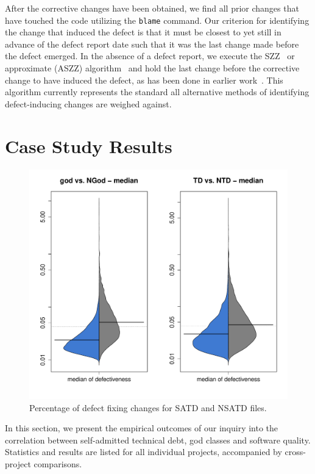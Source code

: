 After the corrective changes have been obtained, we find all prior changes that have touched the code utilizing the \texttt{blame} command. Our criterion for identifying the change that induced the defect is that it must be closest to yet still in advance of the defect report date such that it was the last change made before the defect emerged. In the absence of a defect report, we execute the SZZ~\cite{sliwerski-msr-2005} or approximate (ASZZ) algorithm~\cite{Kamei-tse-2013} and hold the last change before the corrective change to have induced the defect, as has been done in earlier work~\cite{Kamei-tse-2013}. This algorithm currently represents the standard all alternative methods of identifying defect-inducing changes are weighed against.

\section{Case Study Results}
\label{chap4:sec:case_study_results}

\begin{figure}[tb]
	\centering
	\includegraphics[width=140mm]{figures/chapter4/rq1_defectivness_distrubution}
	\caption{Percentage of defect fixing changes for SATD and NSATD files.}
	\label{figure:number_of_fixing_changes_TD_vs_NTD}
\end{figure}

In this section, we present the empirical outcomes of our inquiry into the correlation between self-admitted technical debt, god classes and software quality. Statistics and results are listed for all individual projects, accompanied by cross-project comparisons.

